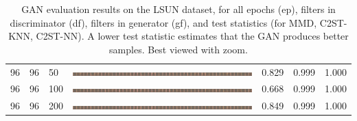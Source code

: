 \documentclass[a4paper]{article}
\begin{document}
\begin{table}[h!]
\begin{center}
{\begin{tabular}{lllcccc}
      96 & 96 & 50  & \includegraphics[width=\textwidth,trim={1536px 0 0 0},clip]{figures/bedrooms_g96_d96_ep50_generator.jpg}   & 0.829 & 0.999 & 1.000\\
      96 & 96 & 100 & \includegraphics[width=\textwidth,trim={1536px 0 0 0},clip]{figures/bedrooms_g96_d96_ep100_generator.jpg}  & 0.668 & 0.999 & 1.000\\
      96 & 96 & 200 & \includegraphics[width=\textwidth,trim={1536px 0 0 0},clip]{figures/bedrooms_g96_d96_ep200_generator.jpg}  & 0.849 & 0.999 & 1.000\\
      \hline
    \end{tabular}
    }
    \end{center}
    \vspace{-0.2cm}
    \caption{GAN evaluation results on the LSUN dataset, for all epochs (ep),
    filters in discriminator (df), filters in generator (gf), and test
    statistics (for MMD, C2ST-KNN, C2ST-NN). A lower test statistic estimates
    that the GAN produces better samples. Best viewed with zoom.}
    \vspace{-0.2cm}
    \label{table:bedrooms}
  \end{table}
  \clearpage
  \newpage
\end{document}
